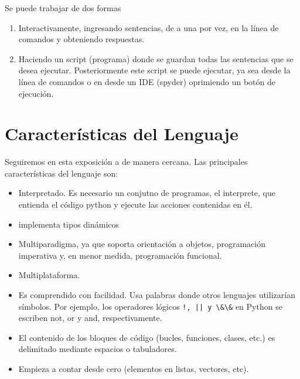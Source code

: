 Se puede trabajar de dos formas

\begin{enumerate}
\item Interactivamente, ingresando sentencias, de a una por vez, en la línea de comandos y obteniendo respuestas.

\item Haciendo un script (programa) donde se guardan todas las sentencias que se desea ejecutar. Posteriormente este script se puede ejecutar, ya sea desde la línea de comandos o en desde un IDE (spyder) oprimiendo un botón de ejecución.

\end{enumerate}





\section{Características del Lenguaje}

Seguiremos en esta exposición a \cite{wiki_python} de manera cercana. Las principales características del lenguaje son:

\begin{itemize}
\item Interpretado. Es necesario un conjutno de programas, el interprete, que entienda el código python y ejecute las acciones contenidas en él.
\item implementa  tipos dinámicos
\item  Multiparadigma, ya que soporta orientación a objetos, programación imperativa y, en menor medida, programación funcional.
\item Multiplataforma.

\item Es comprendido  con facilidad. Usa  palabras donde otros lenguajes utilizarían símbolos. Por ejemplo, los operadores lógicos \verb~!, || y \&\&~ en Python se escriben not, or y and, respectivamente.


\item  El contenido de los bloques de código (bucles, funciones, clases, etc.) es delimitado mediante espacios o tabuladores.

\item Empieza a contar desde cero (elementos en listas, vectores, etc).



\end{itemize}




